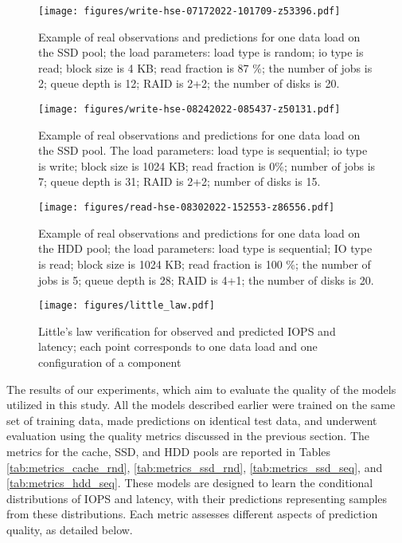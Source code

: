 \begin{figure*}
\centerline{\texttt{[image: figures/write-hse-07172022-101709-z53396.pdf]}}
\caption{Example of real observations and predictions for one data load on the SSD pool; the load parameters: load type is random; io type is read; block size is 4 KB; read fraction is 87 \%; the number of jobs is 2; queue depth is 12; RAID is 2+2; the number of disks is 20.}
\label{fig:ex_ssd_rnd}
\end{figure*}

\begin{figure*}
\centerline{\texttt{[image: figures/write-hse-08242022-085437-z50131.pdf]}}
\caption{Example of real observations and predictions for one data load on the SSD pool. The load parameters: load type is sequential; io type is write; block size is 1024 KB; read fraction is 0\%; number of jobs is 7; queue depth is 31; RAID is 2+2; number of disks is 15.}
\label{fig:ex_ssd_seq}
\end{figure*}

\begin{figure*}
\centerline{\texttt{[image: figures/read-hse-08302022-152553-z86556.pdf]}}
\caption{Example of real observations and predictions for one data load on the HDD pool; the load parameters: load type is sequential; IO type is read; block size is 1024 KB; read fraction is 100 \%; the number of jobs is 5; queue depth is 28; RAID is 4+1; the number of disks is 20.}
\label{fig:ex_hdd_seq}
\end{figure*}



\begin{figure}
\centerline{\texttt{[image: figures/little\_law.pdf]}}
\caption{Little's law verification for observed and predicted IOPS and latency; each point corresponds to one data load and one configuration of a component}
\label{fig:little-law}
\end{figure}


The results of our experiments, which aim to evaluate the quality of the models utilized in this study. All the models described earlier were trained on the same set of training data, made predictions on identical test data, and underwent evaluation using the quality metrics discussed in the previous section. The metrics for the cache, SSD, and HDD pools are reported in Tables \ref{tab:metrics_cache_rnd}, \ref{tab:metrics_ssd_rnd}, \ref{tab:metrics_ssd_seq}, and \ref{tab:metrics_hdd_seq}. These models are designed to learn the conditional distributions of IOPS and latency, with their predictions representing samples from these distributions. Each metric assesses different aspects of prediction quality, as detailed below.

